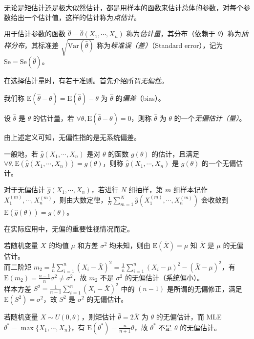 \documentclass[../main.tex]{subfiles}
\begin{document}
无论是矩估计还是极大似然估计，都是用样本的函数来估计总体的参数，对每个参数给出一个估计值，这样的估计称为\emph{点估计}。

用于估计参数的函数 $\hat\theta=\hat\theta(X_1,\cdots,X_n)$ 称为\emph{估计量}，其分布（依赖于 $\theta$）称为\emph{抽样分布}，其标准差 $\sqrt{\mathrm{Var}(\hat\theta)}$ 称为\emph{标准误（差）}（Standard error），记为 $\mathrm{Se}=\mathrm{Se}(\hat\theta)$。

在选择估计量时，有若干准则。首先介绍所谓\emph{无偏性}。

我们称 $\mathrm E(\hat\theta-\theta)=\mathrm E(\hat\theta)-\theta$ 为 $\hat\theta$ 的\emph{偏差}（bias）。

\begin{definition}\label{def:6.3.1}
    设 $\hat\theta$ 是 $\theta$ 的估计量，若 $\forall\theta,\mathrm E(\hat\theta-\theta)=0$，则称 $\hat\theta$ 为 $\theta$ 的一个\emph{无偏估计（量）}。
\end{definition}

由上述定义可知，无偏性指的是无系统偏差。

一般地，若 $\hat g(X_1,\cdots,X_n)$ 是对 $\theta$ 的函数 $g(\theta)$ 的估计，且满足 $\forall\theta,\mathrm E(\hat g(X_1,\cdots,X_n))=g(\theta)$，则称 $\hat g(X_1,\cdots,X_n)$ 是 $g(\theta)$ 的一个无偏估计。

对于无偏估计 $\hat g(X_1,\cdots,X_n)$，若进行 $N$ 组抽样，第 $m$ 组样本记作 $X_1^{(m)},\cdots,X_n^{(m)}$，则由大数定律，$\frac1N\sum_{m=1}^N\hat g(X_1^{(m)},\cdots,X_n^{(m)})$ 会收敛到 $\mathrm E(\hat g(\theta))=g(\theta)$。

在实际应用中，无偏的重要性视情况而定。

\begin{example}
    若随机变量 $X$ 的均值 $\mu$ 和方差 $\sigma^2$ 均未知，则由 $\mathrm E(\bar X)=\mu$ 知 $\bar X$ 是 $\mu$ 的无偏估计。\\
    而二阶矩 $m_2= \frac1n\sum_{i=1}^n(X_i-\bar X)^2=\frac1n\sum_{i=1}^n(X_i-\mu)^2-(\bar X-\mu)^2$，有 $\mathrm E(m_2)=\frac{n-1}n\sigma^2\neq\sigma^2$，故 $m_2$ 不是 $\sigma^2$ 的无偏估计（系统偏小）。\\
    样本方差 $S^2=\frac1{n-1}\sum_{i=1}^n(X_i-\bar X)^2$ 中的 $(n-1)$ 是所谓的无偏修正，满足 $\mathrm E(S^2)=\sigma^2$，故 $S^2$ 是 $\sigma^2$ 的无偏估计。
\end{example}

\begin{example}
    若随机变量 $X\sim U(0,\theta)$，则矩估计 $\hat\theta=2\bar X$ 为 $\theta$ 的无偏估计，而 MLE $\theta^*=\max\{X_1,\cdots,X_n\}$，有 $\mathrm E(\theta^*)=\frac n{n+1}\theta$，故 $\theta^*$ 不是 $\theta$ 的无偏估计。
\end{example}
\end{document}
